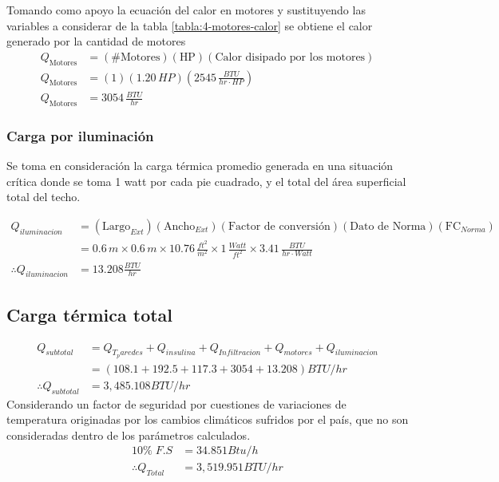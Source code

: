  	Tomando como apoyo la ecuación del calor en motores y sustituyendo las variables a considerar de la tabla \ref{tabla:4-motores-calor} se obtiene el calor generado por la cantidad de motores
 	\begin{equation}
 		\begin{aligned}
 			Q_{\text{Motores}} &= (\#\text{Motores}) (\text{HP}) (\text{Calor disipado por los motores}) \\
 			Q_{\text{Motores}} &= (1)(1.20 \,  {HP}) \left( 2545 \, \frac{ {BTU}}{ {hr} \cdot  {HP}} \right) \\
 			Q_{\text{Motores}} &= 3054 \, \frac{ {BTU}}{ {hr}} 
 		\end{aligned}
 	\end{equation}
 	\subsubsection{Carga por iluminación}
 	Se toma en consideración la carga térmica promedio generada en una situación crítica
 	donde se toma 1 watt por cada pie cuadrado, y el total del área superficial total del techo.
 	
 	\begin{equation}
 		\begin{aligned}
 			Q_{iluminacion} &= (\text{Largo}_{Ext})(\text{Ancho}_{Ext})(\text{Factor de conversión})(\text{Dato de Norma})(\text{FC}_{Norma}) \\
 			&= 0.6\, m \times 0.6\, m \times 10.76\, \frac{ft^2}{m^2} \times 1\, \frac{Watt}{ft^2} \times 3.41\, \frac{BTU}{hr \cdot Watt} \\
 		\therefore Q_{iluminacion} &=  13.208 \frac{BTU}{hr}
 		\end{aligned}
 	\end{equation}
 	 \subsection{Carga térmica total}
 	
 	 \begin{equation}
 	 	\begin{aligned}
 	 		Q_{subtotal} &=Q_{T_paredes}+Q_{insulina}+Q_{Infiltracion}+ Q_{motores}+ Q_{iluminacion} \\
 	 		&= (108.1+192.5+ 117.3 + 3054+13.208)BTU/hr\\
 	 		 \therefore Q_{subtotal} &=3,485.108 BTU/hr
 	 	\end{aligned}
 	 \end{equation}
 	Considerando un factor de seguridad por cuestiones de variaciones de temperatura originadas
 	por los cambios climáticos sufridos por el país, que no son consideradas dentro de los
 	parámetros calculados.
 	 \begin{equation}
 		\begin{aligned}
 			10\% \; F.S &=34.851 Btu/h\\
 			\therefore Q_{Total} &=3,519.951 BTU/hr
 		\end{aligned}
 	\end{equation}
 	
